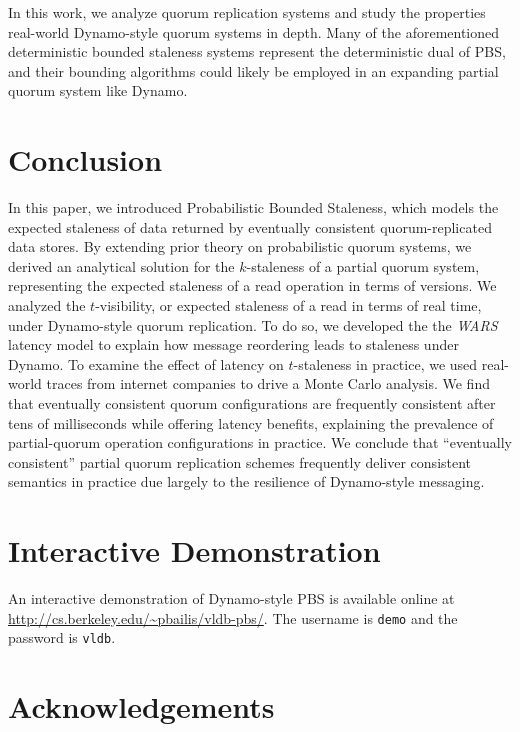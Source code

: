 \documentclass{vldb}
\newcommand{\sectionskip}{-0em}
\begin{document}
In this work, we analyze quorum replication systems and study the
properties real-world Dynamo-style quorum systems in depth.  Many of
the aforementioned deterministic bounded staleness systems represent the
deterministic dual of PBS, and their bounding algorithms could likely
be employed in an expanding partial quorum system like Dynamo.

\vspace{\sectionskip}\section{Conclusion}
\label{sec:conclusion}

In this paper, we introduced Probabilistic Bounded Staleness, which
models the expected staleness of data returned by eventually
consistent quorum-replicated data stores.  By extending prior theory
on probabilistic quorum systems, we derived an analytical solution for
the $k$-staleness of a partial quorum system, representing the
expected staleness of a read operation in terms of versions.  We
analyzed the $t$-visibility, or expected staleness of a read in terms
of real time, under Dynamo-style quorum replication.  To do so, we
developed the the \textit{WARS} latency model to explain how message
reordering leads to staleness under Dynamo.  To examine the effect of
latency on $t$-staleness in practice, we used real-world traces from
internet companies to drive a Monte Carlo analysis.  We find that
eventually consistent quorum configurations are frequently consistent
after tens of milliseconds while offering latency benefits, explaining
the prevalence of partial-quorum operation configurations in practice.
We conclude that ``eventually consistent'' partial quorum replication
schemes frequently deliver consistent semantics in practice due
largely to the resilience of Dynamo-style messaging.

\section*{Interactive Demonstration}

An interactive demonstration of Dynamo-style PBS is available online
at \url{http://cs.berkeley.edu/~pbailis/vldb-pbs/}.  The username is
\texttt{demo} and the password is \texttt{vldb}.

\section*{Acknowledgements}
\end{document}
